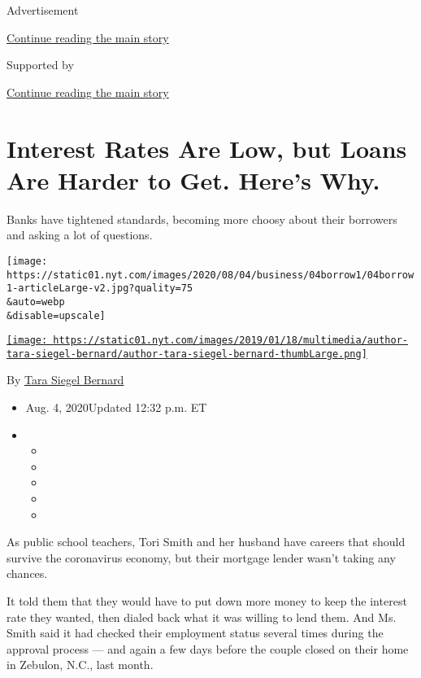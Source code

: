 Advertisement

\protect\hyperlink{after-top}{Continue reading the main story}

Supported by

\protect\hyperlink{after-sponsor}{Continue reading the main story}

\hypertarget{interest-rates-are-low-but-loans-are-harder-to-get-heres-why}{%
\section{Interest Rates Are Low, but Loans Are Harder to Get. Here's
Why.}\label{interest-rates-are-low-but-loans-are-harder-to-get-heres-why}}

Banks have tightened standards, becoming more choosy about their
borrowers and asking a lot of questions.

\texttt{[image: https://static01.nyt.com/images/2020/08/04/business/04borrow1/04borrow1-articleLarge-v2.jpg?quality=75\\\&auto=webp\\\&disable=upscale]}

\href{https://www.nytimes.com/by/tara-siegel-bernard}{\texttt{[image: https://static01.nyt.com/images/2019/01/18/multimedia/author-tara-siegel-bernard/author-tara-siegel-bernard-thumbLarge.png]}}

By \href{https://www.nytimes.com/by/tara-siegel-bernard}{Tara Siegel
Bernard}

\begin{itemize}
\item
  Aug. 4, 2020Updated 12:32 p.m. ET
\item
  \begin{itemize}
  \item
  \item
  \item
  \item
  \item
  \end{itemize}
\end{itemize}

As public school teachers, Tori Smith and her husband have careers that
should survive the coronavirus economy, but their mortgage lender wasn't
taking any chances.

It told them that they would have to put down more money to keep the
interest rate they wanted, then dialed back what it was willing to lend
them. And Ms. Smith said it had checked their employment status several
times during the approval process --- and again a few days before the
couple closed on their home in Zebulon, N.C., last month.

